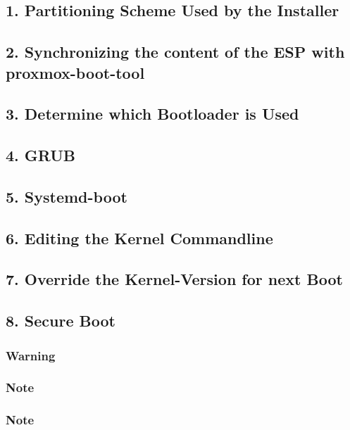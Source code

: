 \subsection{1. Partitioning Scheme Used by the Installer}

\subsection{2. Synchronizing the content of the ESP with proxmox-boot-tool}

\subsection{3. Determine which Bootloader is Used}

\subsection{4. GRUB}

\subsection{5. Systemd-boot}

\subsection{6. Editing the Kernel Commandline}

\subsection{7. Override the Kernel-Version for next Boot}

\subsection{8. Secure Boot}

\subsubsection{Warning}

\subsubsection{Note}

\subsubsection{Note}

